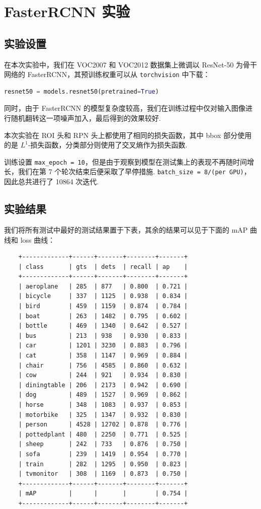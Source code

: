 \documentclass[notitlepage,cs4size,punct,oneside]{ctexrep}
\numberwithin{equation}{chapter}
\theoremstyle{mystyle}
\begin{document}
\section{FasterRCNN 实验}

\subsection{实验设置}
在本次实验中，我们在 VOC2007 和 VOC2012 数据集上微调以 ResNet-50 为骨干网络的 FasterRCNN，其预训练权重可以从 \lstinline|torchvision| 中下载：

\begin{lstlisting}[language=Python]
resnet50 = models.resnet50(pretrained=True)
\end{lstlisting}

同时，由于 FasterRCNN 的模型复杂度较高，我们在训练过程中仅对输入图像进行随机翻转这一项噪声加入，最后得到的效果较好.

本次实验在 ROI 头和 RPN 头上都使用了相同的损失函数，其中 bbox 部分使用的是 $L^{1}$-损失函数，分类部分则使用了交叉熵作为损失函数.

训练设置 \lstinline|max_epoch = 10|，但是由于观察到模型在测试集上的表现不再随时间增长，我们在第 7 个轮次结束后便采取了早停措施. \lstinline|batch_size = 8/(per GPU)|，因此总共进行了 10864 次迭代.
\subsection{实验结果}

我们将所有测试中最好的测试结果置于下表，其余的结果可以见于下面的 mAP 曲线和 loss 曲线：

\begin{lstlisting}
    +-------------+------+-------+--------+-------+
    | class       | gts  | dets  | recall | ap    |
    +-------------+------+-------+--------+-------+
    | aeroplane   | 285  | 877   | 0.800  | 0.721 |
    | bicycle     | 337  | 1125  | 0.938  | 0.834 |
    | bird        | 459  | 1159  | 0.874  | 0.784 |
    | boat        | 263  | 1482  | 0.795  | 0.602 |
    | bottle      | 469  | 1340  | 0.642  | 0.527 |
    | bus         | 213  | 938   | 0.930  | 0.833 |
    | car         | 1201 | 3230  | 0.883  | 0.796 |
    | cat         | 358  | 1147  | 0.969  | 0.884 |
    | chair       | 756  | 4585  | 0.860  | 0.632 |
    | cow         | 244  | 921   | 0.934  | 0.830 |
    | diningtable | 206  | 2173  | 0.942  | 0.690 |
    | dog         | 489  | 1527  | 0.969  | 0.862 |
    | horse       | 348  | 1083  | 0.937  | 0.853 |
    | motorbike   | 325  | 1347  | 0.932  | 0.830 |
    | person      | 4528 | 12702 | 0.878  | 0.776 |
    | pottedplant | 480  | 2250  | 0.771  | 0.525 |
    | sheep       | 242  | 733   | 0.876  | 0.750 |
    | sofa        | 239  | 1419  | 0.954  | 0.770 |
    | train       | 282  | 1295  | 0.950  | 0.823 |
    | tvmonitor   | 308  | 1169  | 0.873  | 0.750 |
    +-------------+------+-------+--------+-------+
    | mAP         |      |       |        | 0.754 |
    +-------------+------+-------+--------+-------+
\end{lstlisting}
\end{document}
